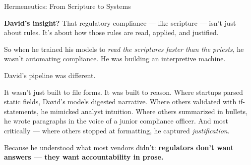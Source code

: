 \begin{PhilosophicalSidebar}{Hermeneutics: From Scripture to Systems}
    \medskip
    
    \textbf{David’s insight?}  
    That regulatory compliance --- like scripture --- isn’t just about rules.  
    It’s about how those rules are read, applied, and justified.
    
    \medskip
    
    So when he trained his models to \textit{read the scriptures faster than the priests},  
    he wasn’t automating compliance.  
    He was building an interpretive machine.
    
\end{PhilosophicalSidebar}

\medskip

David’s pipeline was different.

It wasn’t just built to file forms. It was built to reason.
Where startups parsed static fields, David’s models digested narrative.
Where others validated with if-statements, he mimicked analyst intuition.
Where others summarized in bullets, he wrote paragraphs in the voice of a junior compliance officer.
And most critically — where others stopped at formatting, he captured \textit{justification}.

Because he understood what most vendors didn’t:
\textbf{regulators don’t want answers — they want accountability in prose.}

\medskip

